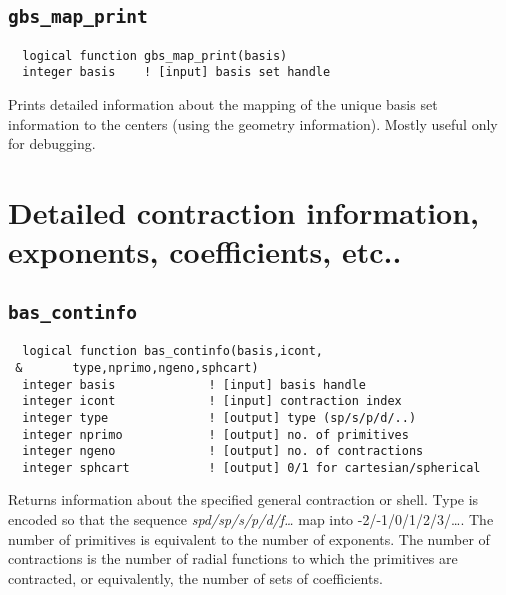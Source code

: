 \subsection{{\tt gbs\_map\_print}}
\begin{verbatim}
  logical function gbs_map_print(basis)
  integer basis    ! [input] basis set handle
\end{verbatim}
Prints detailed information about the mapping of the unique basis set
information to the centers (using the geometry information).  Mostly
useful only for debugging.


\section{Detailed contraction information, exponents, coefficients,
  etc..} 

\subsection{{\tt bas\_continfo}}
\begin{verbatim}
  logical function bas_continfo(basis,icont,
 &       type,nprimo,ngeno,sphcart)
  integer basis             ! [input] basis handle
  integer icont             ! [input] contraction index
  integer type              ! [output] type (sp/s/p/d/..)
  integer nprimo            ! [output] no. of primitives
  integer ngeno             ! [output] no. of contractions
  integer sphcart           ! [output] 0/1 for cartesian/spherical
\end{verbatim}
Returns information about the specified general contraction or shell.
Type is encoded so that the sequence {\em spd/sp/s/p/d/f\ldots} map
into -2/-1/0/1/2/3/\ldots.  The number of primitives is equivalent to
the number of exponents.  The number of contractions is the number of
radial functions to which the primitives are contracted, or equivalently,
the number of sets of coefficients.

